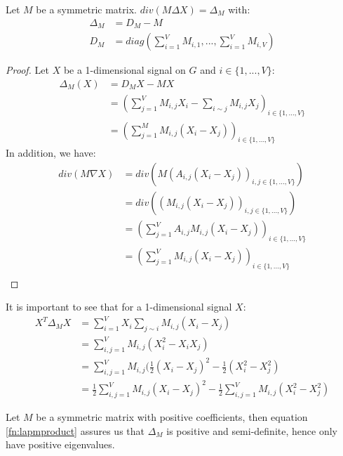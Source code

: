 \documentclass[12pt]{article}
\begin{document}
\begin{thm}
    Let $M$ be a symmetric matrix. $div(M \Delta X) = \Delta_M$ with:
    \begin{align*}
        \Delta_M &= D_M - M \\
        D_M &= diag(\sum_{i=1}^V M_{i,1},..., \sum_{i=1}^V M_{i,V})
    \end{align*}
\end{thm}

\begin{proof}
    Let $X$ be a 1-dimensional signal on $G$ and $i \in \{1,...,V\}$:
    \begin{align*}
        \Delta_M(X) &= D_M X - MX\\
        &= (\sum_{j=1}^V M_{i,j}X_i - \sum_{i \sim j} M_{i,j} X_j)_{i \in  \{1,...,V\}} \\
        &= (\sum_{j=1}^M M_{i,j}(X_i-X_j))_{i  \in \{1,...,V\}}
    \end{align*}
    In addition, we have:
    \begin{align*}
        div(M \nabla X) &= div(M(A_{i,j}(X_i - X_j))_{i,j \in \{1,...,V\}}) \\
        &= div((M_{i,j}(X_i - X_j))_{i,j \in \{1,...,V\}}) \\
                    &= (\sum_{j=1}^V A_{i,j} M_{i,j}(X_i - X_j))_{i \in \{1,...,V\}} \\
                    &= (\sum_{j=1}^V M_{i,j}(X_i - X_j))_{i \in \{1,...,V\}} \\
    \end{align*}
\end{proof}

It is important to see that for a 1-dimensional signal $X$:
\begin{align}\label{fn:lapmproduct}
    X^T \Delta_M X &= \sum_{i=1}^V X_i \sum_{j \sim i} M_{i,j}(X_i-X_j) \nonumber\\
                    &= \sum_{i,j=1}^V M_{i,j} (X_i^2 - X_i X_j) \nonumber\\
                    &= \sum_{i,j=1}^V M_{i,j}(\frac{1}{2}(X_i - X_j)^2 - \frac{1}{2}(X_i^2-X_j^2) \nonumber\\
                    &= \frac{1}{2}\sum_{i,j=1}^V M_{i,j}(X_i - X_j)^2 - \frac{1}{2}\sum_{i,j=1}^V M_{i,j}(X_i^2-X_j^2)
\end{align}

Let $M$ be a symmetric matrix with positive coefficients, then equation \ref{fn:lapmproduct} assures us that $\Delta_M$ is positive and semi-definite, hence only have positive eigenvalues.
\end{document}
